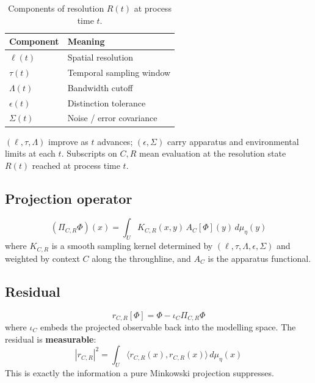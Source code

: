 \documentclass[11pt,a4paper]{article}
\newcommand{\Ph}{\Phi}
\begin{document}
\begin{table}[h]
  \centering
  \caption{Components of resolution $R(t)$ at process time $t$.}
  \label{tab:resolution}
  \begin{tabular}{@{}ll@{}}
    \toprule
    Component & Meaning \\
    \midrule
    $\ell(t)$ & Spatial resolution \\
    $\tau(t)$ & Temporal sampling window \\
    $\Lambda(t)$ & Bandwidth cutoff \\
    $\epsilon(t)$ & Distinction tolerance \\
    $\Sigma(t)$ & Noise / error covariance \\
    \bottomrule
  \end{tabular}
\end{table}

$(\ell,\tau,\Lambda)$ improve as $t$ advances; $(\epsilon,\Sigma)$ carry apparatus and environmental limits at each $t$. Subscripts on $C,R$ mean evaluation at the resolution state $R(t)$ reached at process time $t$.

\subsection{Projection operator}

\begin{equation}
  (\Pi_{C,R}\Ph)(x) = \int_U K_{C,R}(x,y)\, A_C[\Ph](y)\, d\mu_\eta(y)
  \label{eq:projection}
\end{equation}
where $K_{C,R}$ is a smooth sampling kernel determined by $(\ell,\tau,\Lambda,\epsilon,\Sigma)$ and weighted by context $C$ along the throughline, and $A_C$ is the apparatus functional.

\subsection{Residual}

\begin{equation}
  r_{C,R}[\Ph] = \Ph - \iota_C \Pi_{C,R}\Ph
  \label{eq:residual}
\end{equation}
where $\iota_C$ embeds the projected observable back into the modelling space. The residual is \textbf{measurable}:
\begin{equation}
  |r_{C,R}|^2 = \int_U \langle r_{C,R}(x), r_{C,R}(x) \rangle\, d\mu_\eta(x)
\end{equation}
This is exactly the information a pure Minkowski projection suppresses.
\end{document}
